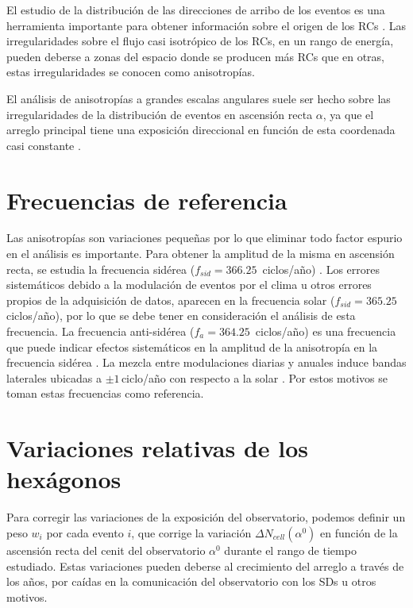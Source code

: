 El estudio de la distribución de las direcciones de arribo de los eventos es una herramienta importante para obtener información sobre el origen de los RCs . Las irregularidades sobre el flujo casi isotrópico de los RCs, en un rango de energía, pueden deberse a  zonas del espacio donde se producen más RCs que en otras, estas irregularidades se conocen como anisotropías. 

El análisis de anisotropías a grandes escalas angulares suele ser hecho sobre las irregularidades de la distribución de eventos en ascensión recta $\alpha$, ya que el arreglo principal tiene una exposición direccional en función de esta coordenada casi constante \cite{referencia_anis}.

\section{Frecuencias de referencia}

Las anisotropías son variaciones pequeñas por lo que eliminar todo factor espurio en el análisis es importante. Para obtener la amplitud de la misma en ascensión recta, se estudia la frecuencia sidérea ($f_{sid}=366.25\,$ ciclos/año) \cite{taborda}. Los errores sistemáticos debido a la modulación de eventos por el clima u otros errores propios de la adquisición de datos, aparecen en la frecuencia solar  ($f_{sid}=365.25\,$ ciclos/año), por lo que se debe tener en consideración el análisis de esta frecuencia. La frecuencia anti-sidérea ($f_a=364.25\,$ ciclos/año) es una frecuencia que puede indicar efectos sistemáticos en la amplitud de la anisotropía en la frecuencia sidérea \cite{farley1954sidereal}. La mezcla entre modulaciones diarias y anuales induce bandas laterales ubicadas a $\pm1\,$ciclo/año con respecto a la solar \cite{taborda}. Por estos motivos se toman estas frecuencias  como referencia.

\section{Variaciones relativas de los hexágonos} \label{peso_hexagonos}

Para corregir las variaciones de la exposición del observatorio, podemos definir un peso  $w_i$ por cada evento $i$, que corrige la variación  $\Delta N_{cell}(\alpha^0)$ en función de la ascensión recta del cenit del observatorio $\alpha^0$ durante el rango de tiempo estudiado. Estas variaciones pueden deberse al crecimiento del arreglo a través de los años,  por caídas en la comunicación del observatorio con los SDs u otros motivos. 

